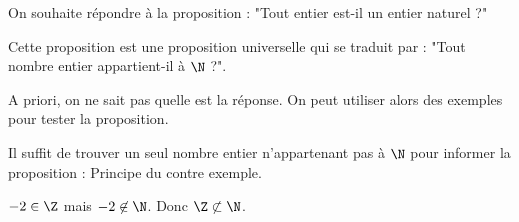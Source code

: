 \begin{pageCours}
\begin{LogT}{On souhaite répondre à la proposition : "Tout entier est-il un entier naturel ?"  }

Cette proposition est une proposition universelle qui se traduit par : "Tout nombre entier appartient-il à $\N$ ?". 

A priori, on ne sait pas quelle est la réponse. On peut utiliser alors des exemples pour tester la proposition.

Il suffit de trouver un seul nombre entier n'appartenant pas à $\N$ pour informer la proposition : Principe du contre exemple. 


$-2 \in \Z$ mais $-2 \not \in \N$. Donc $\Z \not \subset \N$.

\end{LogT}


\end{pageCours} 
